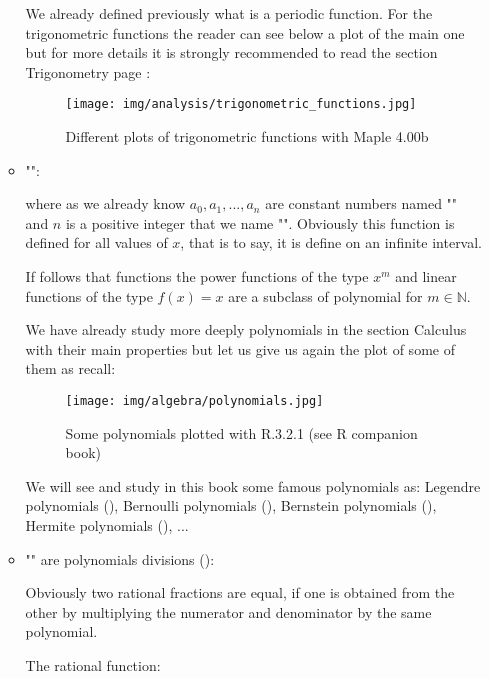 \begin{enumerate}
\begin{itemize}
			We already defined previously what is a periodic function. For the trigonometric functions the reader can see below a plot of the main one but for more details it is strongly recommended to read the section Trigonometry page \pageref{trigonometry}:
			\begin{figure}[H]
				\centering
				\texttt{[image: img/analysis/trigonometric\_functions.jpg]}
				\caption{Different plots of trigonometric functions with Maple 4.00b}
			\end{figure}
			
			\item "":
			
			
			where as we already know $a_0,a_1,...,a_n$ are constant numbers named "" and $n$ is a positive integer that we name "". Obviously this function is defined for all values of $x$, that is to say, it is define on an infinite interval.
			
			If follows that functions the power functions of the type $x^m$ and linear functions of the type $f(x)=x$ are a subclass of polynomial for $m\in \mathbb{N}$.
			
			We have already study more deeply polynomials in the section Calculus with their main properties but let us give us again the plot of some of them as recall: 
			\begin{figure}[H]
				\centering
				\texttt{[image: img/algebra/polynomials.jpg]}
				\caption[Some polynomials plotted with R.3.2.1]{Some polynomials plotted with R.3.2.1 (see R companion book)}
			\end{figure}
			We will see and study in this book some famous polynomials as: Legendre polynomials (), Bernoulli polynomials (), Bernstein polynomials (), Hermite polynomials (), ...
			
			\item "" are polynomials divisions ():
			
			\begin{tcolorbox}[title=Remark,colframe=black,arc=10pt]
			Obviously two rational fractions are equal, if one is obtained from the other by multiplying the numerator and denominator by the same polynomial.
			\end{tcolorbox}
			The rational function:
			

\end{itemize}
\end{enumerate}
